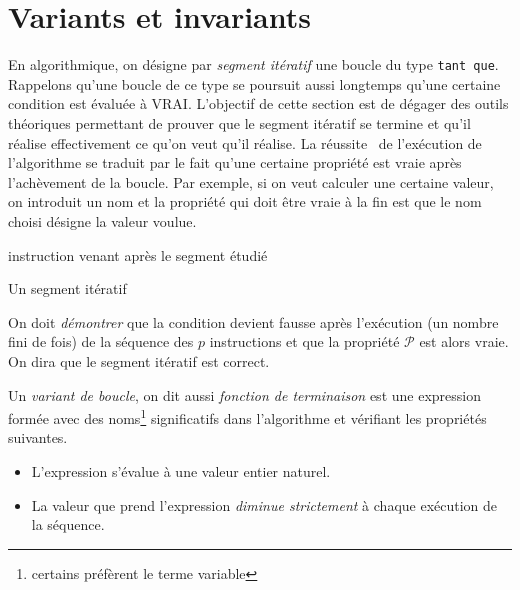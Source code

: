 

\section{Variants et invariants}
En algorithmique, on désigne par \emph{segment itératif} une boucle du type \og\verb|tant que|\fg. 
Rappelons qu'une boucle de ce type se poursuit aussi longtemps qu'une certaine condition est évaluée à VRAI.\newline
L'objectif de cette section est de dégager des outils théoriques permettant de prouver que le segment itératif se termine et qu'il réalise effectivement ce qu'on veut qu'il réalise. La \og réussite\fg~ de l'exécution de l'algorithme se traduit par le fait qu'une certaine propriété est vraie après l'achèvement de la boucle. Par exemple, si on veut calculer une certaine valeur, on introduit un nom et la propriété qui doit être vraie à la fin est que le nom choisi désigne la valeur voulue.\newline
\begin{algorithm}
  instruction venant après le segment étudié\;
  \caption{Un segment itératif}
  \label{corsegit_1}
\end{algorithm}
On doit \emph{démontrer} que la condition devient fausse après l'exécution (un nombre fini de fois) de la séquence des $p$ instructions et que la propriété $\mathcal{P}$ est alors vraie. On dira que le segment itératif est correct.
\begin{defi}
Un \emph{variant de boucle}, on dit aussi \emph{fonction de terminaison} est une expression formée avec des noms\footnote{certains préfèrent le terme \og variable\fg} significatifs dans l'algorithme et vérifiant les propriétés suivantes.
\begin{itemize}                                                                                                                                                                                                                                               \item L'expression s'évalue à une valeur entier naturel.
\item La valeur que prend l'expression \emph{diminue strictement} à chaque exécution de la séquence.                                                                                                                                                                                                                             \end{itemize}
\end{defi}
